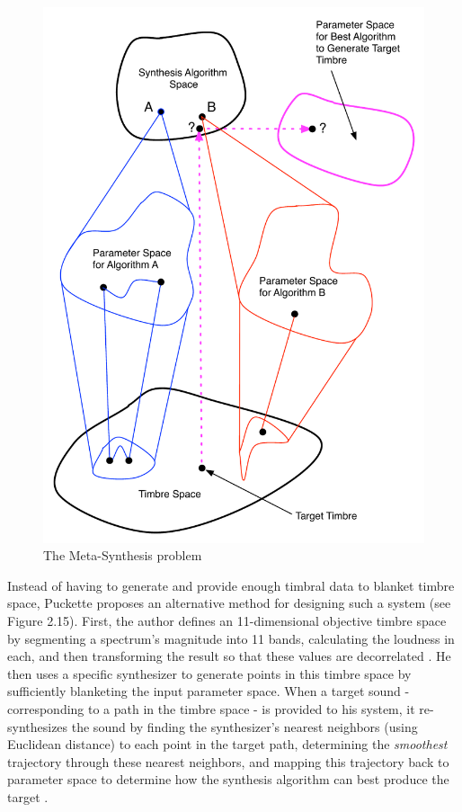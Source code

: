 \documentclass[a4paper,12pt]{report} 	%
\numberwithin{figure}{chapter}
\numberwithin{table}{chapter}
\numberwithin{equation}{chapter}
\begin{document}
\begin{flushleft}
\begin{figure}[h!]
\begin{center}
\includegraphics[scale=0.80]{MetaSynthesis1}
\caption[The Meta-Synthesis Problem]{The Meta-Synthesis problem}
\end{center}
\end{figure}
Instead of having to generate and provide enough timbral data to blanket timbre space, Puckette \cite{Puckette:2004zp} proposes an alternative method for designing such a system (see Figure 2.15). First, the author defines an 11-dimensional objective timbre space by segmenting a spectrum's magnitude into 11 bands, calculating the loudness in each, and then transforming the result so that these values are decorrelated \cite[p. 1-2]{Puckette:2004zp}. He then uses a specific synthesizer to generate points in this timbre space by sufficiently blanketing the input parameter space. When a target sound - corresponding to a path in the timbre space - is provided to his system, it re-synthesizes the sound by finding the synthesizer's nearest neighbors (using Euclidean distance) to each point in the target path, determining the \emph{smoothest} trajectory through these nearest neighbors, and mapping this trajectory back to parameter space to determine how the synthesis algorithm can best produce the target \cite[p. 3]{Puckette:2004zp}. 


\end{flushleft}
\end{document}
